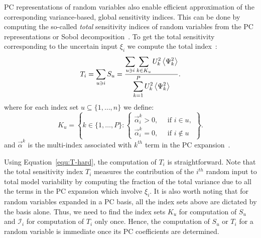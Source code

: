 PC representations of random variables also enable efficient
approximation of the corresponding variance-based, global
sensitivity indices. This can be done by computing the so-called {\it total} 
sensitivity indices of random variables from the PC representations or Sobol decomposition~\citep{Sobol:1993,Homma:1996,Sobol:2001}. To get the total sensitivity corresponding to the uncertain
input $\xi_i$ we compute the total index~\citep{LeMaitreKnio2010,Crestaux,Sudret}:
\begin{equation} \label{equ:T-hard}
   T_i = \displaystyle \sum_{u \ni i} S_u =
         \frac{\displaystyle
              \sum_{u \ni i} \sum_{k \in K_u} U_k^2 \left\langle {\Psi_k^2} \right\rangle}
              {\displaystyle\sum_{k = 1}^P U_k^2 \left\langle {\Psi_k^2} \right\rangle} .
\end{equation}
where for each index set $u \subseteq \{1, \ldots, n\}$ we define:
\[
   K_u = \left\{ k \in \{1, \ldots, P\} :
          \begin{cases}
           \vec{\alpha}^k_i > 0, \quad \mbox{ if } i \in u,\\
           \vec{\alpha}^k_i = 0, \quad \mbox{ if } i \notin u
          \end{cases}\right\}.
        \]
        and $\vec{\alpha}^k$ is the
multi-index associated with $k^{th}$ term in the
PC expansion~\cite{LeMaitreKnio2010}.

Using Equation~\eqref{equ:T-hard}, the computation of $T_i$ is straightforward.
Note that the total sensitivity index $T_i$ measures the contribution of
the $i^{th}$ random input to total model variability by
computing the fraction of the total variance due to all the terms in the
PC expansion which involve $\xi_i$. It is also worth noting that for random variables expanded in a PC basis, all the index sets
above are dictated by the basis alone. Thus, we need to find the index sets $K_u$
for computation of $S_u$ and $\mathcal{I}_i$ for computation
of $T_i$ only once. Hence, the computation of $S_u$ or $T_i$ for a
random variable is immediate once its PC coefficients are determined.





